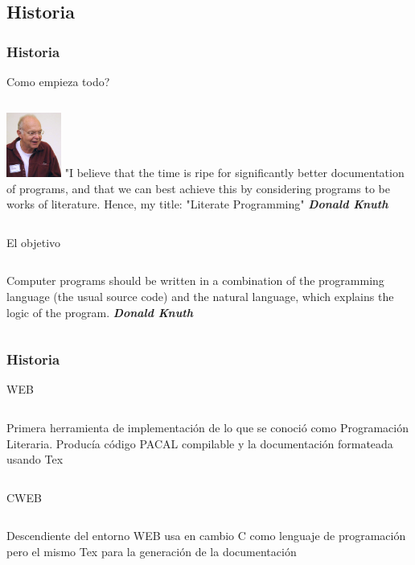 \documentclass[sans serif,9pt,xcolor=dvipsnames]{beamer}%
\begin{document}
\subsection{Historia}
\begin{frame}
\frametitle{Historia}
\begin{block}{Como empieza todo?}
\begin{columns}
 \hspace{0.7cm}
\includegraphics[width=1.8cm]{imagenes/donald.jpg}
\justifying
"I believe that the time is ripe for significantly better documentation of programs, and that we can best achieve this by considering programs to be works of literature. Hence, my title: "Literate Programming" \textbf{\textit{Donald Knuth}}
\end{columns}
\end{block}

\begin{block}{El objetivo}
\begin{columns}
 \hspace{0.7cm}
\justifying
Computer programs should be written in a combination of the programming language (the usual source code) and the natural language, which explains the logic of the program. \textbf{\textit{Donald Knuth}}
\end{columns}
\end{block}

\end{frame}

\begin{frame}
\frametitle{Historia}

\begin{block}{WEB}
\begin{columns}
\justifying
Primera herramienta de implementación de lo que se conoció como Programación Literaria. Producía código PACAL compilable y la documentación formateada usando Tex
\end{columns}
\end{block}

\begin{block}{CWEB}
\begin{columns}
\justifying
Descendiente del entorno WEB usa en cambio C como lenguaje de programación pero el mismo Tex para la generación de la documentación
\end{columns}
\end{block}
\end{frame}
\end{document}
